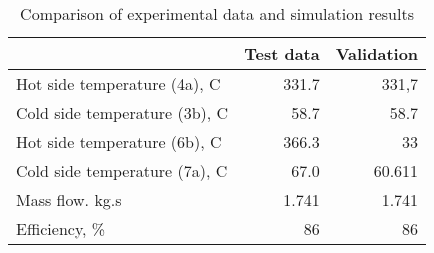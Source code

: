 \begin{table}
\label{tab:Comparison}
\caption{Comparison of experimental data and simulation results}
\begin{center}
\begin{tabulary}{0.9\textwidth}{LRR}
\toprule
& Test data \cite{Iverson_2013}  & Validation \\
\midrule
Hot side temperature (4a), C & 331.7 & 331,7 \\
Cold side temperature (3b), C & 58.7 & 58.7 \\
Hot side temperature (6b), C & 366.3 & 33 \\
Cold side temperature (7a), C & 67.0 & 60.611 \\
Mass flow. kg.s & 1.741 & 1.741 \\
Efficiency, \% & 86 & 86 \\
\bottomrule
\end{tabulary}
\end{center}
\end{table}